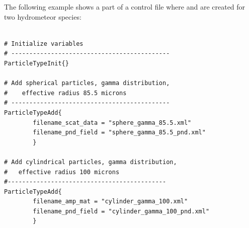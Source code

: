 The following example shows a part of a control file where
 and  are created
for two hydrometeor species:

\begin{verbatim}

# Initialize variables
# --------------------------------------------
ParticleTypeInit{}

# Add spherical particles, gamma distribution,
#    effective radius 85.5 microns
# --------------------------------------------
ParticleTypeAdd{
        filename_scat_data = "sphere_gamma_85.5.xml" 
        filename_pnd_field = "sphere_gamma_85.5_pnd.xml"
        }       

# Add cylindrical particles, gamma distribution, 
#   effective radius 100 microns
#--------------------------------------------
ParticleTypeAdd{
        filename_amp_mat = "cylinder_gamma_100.xml" 
        filename_pnd_field = "cylinder_gamma_100_pnd.xml"
        }   

\end{verbatim}
 

\label{sec:scattering:rt_cloudbox}



